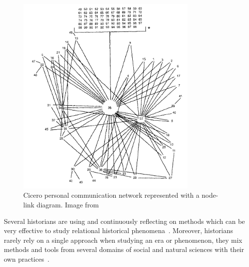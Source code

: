 \begin{figure}[!ht]
    \centering %
    \includegraphics[width=0.8\textwidth]{static/figures/RelatedWork/Cicero_network}
    \caption{Cicero personal communication network represented with a node-link diagram. Image from \cite{alexanderAnalysisAncientNetwork1990}}
    \label{fig:cicero-letters}
\end{figure}


Several historians are using and continuously reflecting on \hsna methods\cite{lemercier12FormalNetwork2015} which can be very effective to study relational historical phenomena~\cite{kerschbaumerPowerNetworksProspects2015}.
Moreover, historians rarely rely on a single approach when studying an era or phenomenon, they mix methods and tools from several domains of social and natural sciences with their own practices~\cite{padgettRobustActionRise1993, petzCombiningNetworkResearch2022}.




